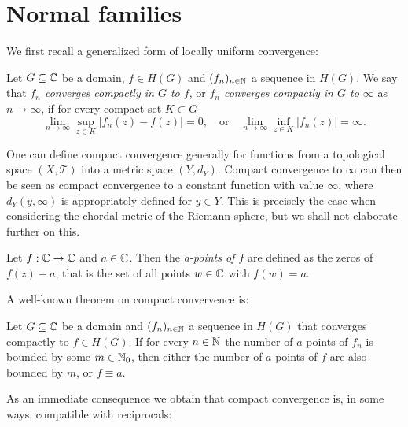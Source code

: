 \section{Normal families}
\label{sec:normal-families}

We first recall a generalized form of locally uniform convergence:

\begin{definition}
    Let $G \subseteq \mathbb{C}$ be a domain, $f \in H(G)$ and $(f_n)_{n \in \mathbb{N}}$ a sequence in $H(G)$. We say that \emph{$f_n$ converges compactly in $G$ to $f$}, or \emph{$f_n$ converges compactly in $G$ to $\infty$} as $n \to \infty$, if for every compact set $K \subset G$
    \begin{equation}
        \lim_{n \to \infty} \sup_{z \in K} \vert f_n(z) - f(z) \vert = 0, \quad \textrm{or} \quad \lim_{n \to \infty} \inf_{z \in K} \vert f_n(z) \vert = \infty.
    \end{equation}
\end{definition}

\begin{remark}
    One can define compact convergence generally for functions from a topological space $(X, \mathcal{T})$ into a metric space $(Y, d_Y)$. Compact convergence to $\infty$ can then be seen as compact convergence to a constant function with value $\infty$, where $d_Y(y, \infty)$ is appropriately defined for $y \in Y$. This is precisely the case when considering the chordal metric of the Riemann sphere, but we shall not elaborate further on this.
\end{remark}

\begin{definition}
    Let $f : \mathbb{C} \to \mathbb{C}$ and $a \in \mathbb{C}$. Then the \emph{a-points of $f$} are defined as the zeros of $f(z) - a$, that is the set of all points $w \in \mathbb{C}$ with $f(w) = a$.
\end{definition}

A well-known theorem on compact convervence is:

\begin{theorem}[Hurwitz] \label{thm:hurwitz}
    Let $G \subseteq \mathbb{C}$ be a domain and $(f_n)_{n \in \mathbb{N}}$ a sequence in $H(G)$ that converges compactly to $f \in H(G)$. If for every $n \in \mathbb{N}$ the number of $a$-points of $f_n$ is bounded by some $m \in \mathbb{N}_0$, then either the number of $a$-points of $f$ are also bounded by $m$, or $f \equiv a$.
\end{theorem}

As an immediate consequence we obtain that compact convergence is, in some ways, compatible with reciprocals:

